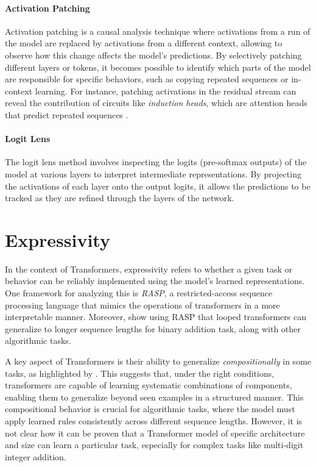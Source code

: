\paragraph{Activation Patching}
Activation patching \parencite{zhang_towards_2023} is a causal analysis technique where activations from a run of the model are replaced by activations from a different context, allowing to observe how this change affects the model's predictions. By selectively patching different layers or tokens, it becomes possible to identify which parts of the model are responsible for specific behaviors, such as copying repeated sequences or in-context learning. For instance, patching activations in the residual stream can reveal the contribution of circuits like \emph{induction heads}, which are attention heads that predict repeated sequences \parencite{olsson_-context_2022}.

\paragraph{Logit Lens}
The logit lens method \parencite{nostalgebraist_interpreting_2020} involves inspecting the logits (pre-softmax outputs) of the model at various layers to interpret intermediate representations. By projecting the activations of each layer onto the output logits, it allows the predictions to be tracked as they are refined through the layers of the network.

\section{Expressivity}\label{sec:expressivity}

In the context of Transformers, expressivity refers to whether a given task or behavior can be reliably implemented using the model's learned representations. One framework for analyzing this is \emph{RASP}, a restricted-access sequence processing language \parencite{weiss_thinking_2021} that mimics the operations of transformers in a more interpretable manner. Moreover, \cite{fan_looped_2024} show using RASP that looped transformers can generalize to longer sequence lengths for binary addition task, along with other algorithmic tasks.

A key aspect of Transformers is their ability to generalize \emph{compositionally} in some tasks, as highlighted by \cite{hupkes_compositionality_2020}. This suggests that, under the right conditions, transformers are capable of learning systematic combinations of components, enabling them to generalize beyond seen examples in a structured manner. This compositional behavior is crucial for algorithmic tasks, where the model must apply learned rules consistently across different sequence lengths. However, it is not clear how it can be proven that a Transformer model of specific architecture and size can learn a particular task, especially for complex tasks like multi-digit integer addition.

